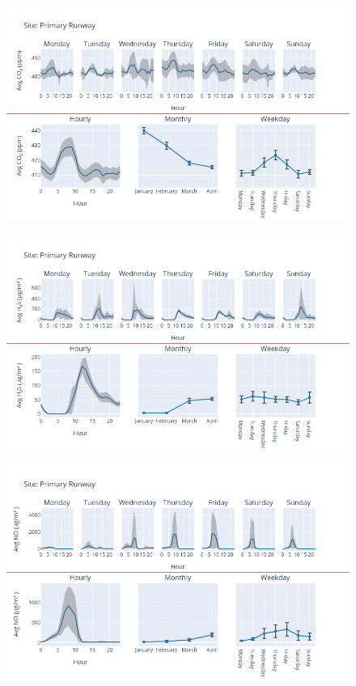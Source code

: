 \documentclass[12pt, oneside]{book}
\begin{document}
{ 
{\begin{figure}[H] 
 \centering 
\includegraphics[width=.88\textwidth, keepaspectratio]{image104} 
 \end{figure}}{} 

{\begin{figure}[H] 
 \centering 
\includegraphics[width=.88\textwidth, keepaspectratio]{image105} 
 \end{figure}}{} 

{\begin{figure}[H] 
 \centering 
\includegraphics[width=.88\textwidth, keepaspectratio]{image106} 
 \end{figure}}{} 

}
\end{document}
